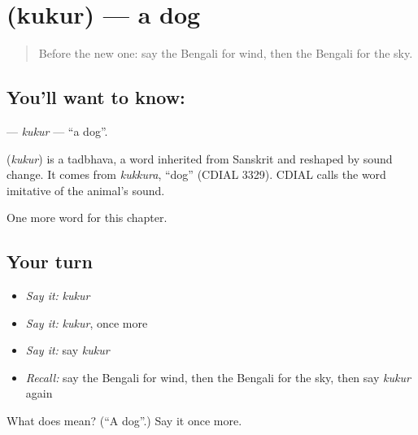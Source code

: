 \section[\texorpdfstring{\bn{কুকুর} (kukur)}{কুকুর (kukur)}]{ (kukur) — a dog}

\label{lesson:BN-C68-kukur}



\begin{quote}
Before the new one: say the Bengali for wind, then the Bengali for the sky.
\end{quote}

\subsection*{You'll want to know: }
\textbf{} — \emph{kukur} — \textquotedblleft{}a dog\textquotedblright{}.

\begin{cousinweb}
\textbf{} (\emph{kukur}) is a tadbhava, a word inherited from Sanskrit and reshaped by sound change. It comes from \emph{kukkura}, \textquotedblleft{}dog\textquotedblright{} (CDIAL 3329). CDIAL calls the word imitative of the animal's sound.
\end{cousinweb}

\begin{grammarlens}[title={What you've built}]
One more word for this chapter.
\end{grammarlens}

\subsection*{Your turn}
\begin{itemize}
\raggedright
  \item \emph{Say it:} \emph{kukur}
  \item \emph{Say it:} \emph{kukur}, once more
  \item \emph{Say it:} say \emph{kukur}
  \item \emph{Recall:} say the Bengali for wind, then the Bengali for the sky, then say \emph{kukur} again
\end{itemize}

\begin{tcolorbox}[breakable,colback=teal!4,colframe=teal!35!black,title={Before you move on}]
What does  mean? (\textquotedblleft{}A dog\textquotedblright{}.) Say it once more.
\end{tcolorbox}

